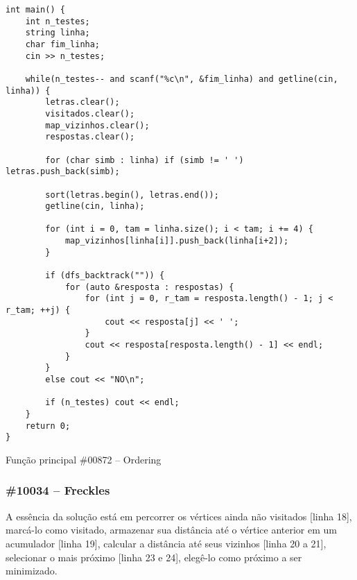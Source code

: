 \documentclass[a4paper,12pt]{scrartcl}
\begin{document}
\begin{listing}[H]
\begin{verbatim}
int main() {
    int n_testes;
    string linha;
    char fim_linha;
    cin >> n_testes;

    while(n_testes-- and scanf("%c\n", &fim_linha) and getline(cin, linha)) {
        letras.clear();
        visitados.clear();
        map_vizinhos.clear();
        respostas.clear();

        for (char simb : linha) if (simb != ' ') letras.push_back(simb);

        sort(letras.begin(), letras.end());
        getline(cin, linha);

        for (int i = 0, tam = linha.size(); i < tam; i += 4) {
            map_vizinhos[linha[i]].push_back(linha[i+2]);
        }

        if (dfs_backtrack("")) {
            for (auto &resposta : respostas) {
                for (int j = 0, r_tam = resposta.length() - 1; j < r_tam; ++j) {
                    cout << resposta[j] << ' ';
                }
                cout << resposta[resposta.length() - 1] << endl;
            }
        }
        else cout << "NO\n";

        if (n_testes) cout << endl;
    }
    return 0;
}
\end{verbatim}
\caption{\footnotesize{Função principal \#00872 – Ordering}}
\end{listing}

\subsubsection{\#10034 – Freckles}
A essência da solução está em percorrer os vértices ainda não visitados [linha 18], marcá-lo como visitado, armazenar sua distância até o vértice anterior em um acumulador [linha 19], calcular a distância até seus vizinhos [linha 20 a 21], selecionar o mais próximo [linha 23 e 24], elegê-lo como próximo a ser minimizado.
\end{document}
